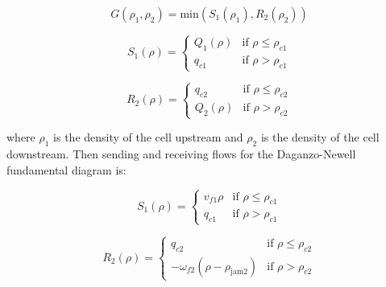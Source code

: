 \begin{equation} \label{eq:rhoGodunovFlux1}
G(\rho_{1},\rho_{2}) = \text{min}(S_{1}(\rho_{1}),R_{2}(\rho_{2}))
\end{equation}

\begin{equation} \label{eq:sendingFlow1}
S_{1}(\rho) = \begin{cases}
Q_{1}(\rho) & \text{if } \rho \leq \rho_{c1} \\
q_{c1} &  \text{if } \rho > \rho_{c1}
\end{cases}
\end{equation}

\begin{equation} \label{eq:receivingFlow1}
R_{2}(\rho) = \begin{cases}
q_{c2} & \text{if } \rho \leq \rho_{c2} \\
Q_{2}(\rho) &  \text{if } \rho > \rho_{c2}
\end{cases}
\end{equation}

\noindent where $\rho_{1}$ is the density of the cell upstream and $\rho_{2}$ is the density of the cell downstream. Then sending and receiving flows for the Daganzo-Newell fundamental diagram is:

\begin{equation} \label{eq:sendingFlow2}
S_{1}(\rho) = \begin{cases}
v_{f1}\rho & \text{if } \rho \leq \rho_{c1} \\
q_{c1} &  \text{if } \rho > \rho_{c1}
\end{cases}
\end{equation}

\begin{equation} \label{eq:receivingFlow2}
R_{2}(\rho) = \begin{cases}
q_{c2} & \text{if } \rho \leq \rho_{c2} \\
-\omega_{f2} \left( \rho - \rho_{\text{jam}2} \right) & \text{if } \rho > \rho_{c2}
\end{cases}
\end{equation}

